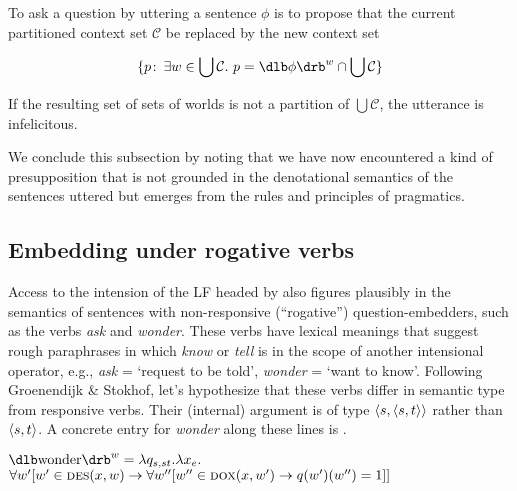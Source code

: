 \begin{definition}\label{def:updatebyquestionfinalrevision}%
  To ask a question by uttering a sentence $\phi$ is to propose that the current
  partitioned context set $\mathcal{C}$ be replaced by the new context set

  \[\{p\co \exists w\in\bigcup\mathcal{C}.\ p = \sv{\phi}^{w}\cap \bigcup\mathcal{C}\}\]

  If the resulting set of sets of worlds is not a partition of
  $\bigcup\mathcal{C}$, the utterance is infelicitous.
\end{definition}

%
We conclude this subsection by noting that we have now encountered a kind of
presupposition that is not grounded in the denotational semantics of the
sentences uttered but emerges from the rules and principles of pragmatics.

\subsection{Embedding under rogative verbs}
\label{sec:embedding-rogative}

Access to the intension of the LF headed by \ans also figures plausibly in the
semantics of sentences with non-responsive (``rogative'') question-embedders,
such as the verbs \emph{ask} and \emph{wonder}. These verbs have lexical
meanings that suggest rough paraphrases in which \emph{know} or \emph{tell} is
in the scope of another intensional operator, e.g., \emph{ask} = `request to be
told', \emph{wonder} = `want to know'. Following Groenendijk \& Stokhof, let's
hypothesize that these verbs differ in semantic type from responsive verbs.
Their (internal) argument is of type $\langle s,\langle s,t \rangle \rangle$ rather than
$\langle s,t \rangle$. A concrete entry for \emph{wonder} along these lines is \Next.

\ex
$\svt{wonder}^{w} = \lambda q_{s,st}.\lambda x_{e}.$\\
\hfill$\forall w' [w'\in\textsc{des}(x,w) \rightarrow \forall w'' [w''\in\textsc{dox}(x,w') \rightarrow q(w')(w'')=1]]$
\xe


